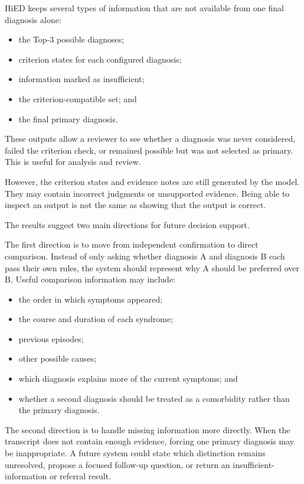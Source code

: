 \documentclass[12pt,a4paper,oneside]{report}
\begin{document}
HiED keeps several types of information that are not available from one
final diagnosis alone:

\begin{itemize}
    \item the Top-3 possible diagnoses;
    \item criterion states for each configured diagnosis;
    \item information marked as insufficient;
    \item the criterion-compatible set; and
    \item the final primary diagnosis.
\end{itemize}

These outputs allow a reviewer to see whether a diagnosis was never
considered, failed the criterion check, or remained possible but was not
selected as primary. This is useful for analysis and review.

However, the criterion states and evidence notes are still generated by
the model. They may contain incorrect judgments or unsupported evidence.
Being able to inspect an output is not the same as showing that the
output is correct.

The results suggest two main directions for future decision support.

The first direction is to move from independent confirmation to direct
comparison. Instead of only asking whether diagnosis A and diagnosis B
each pass their own rules, the system should represent why A should be
preferred over B. Useful comparison information may include:

\begin{itemize}
    \item the order in which symptoms appeared;
    \item the course and duration of each syndrome;
    \item previous episodes;
    \item other possible causes;
    \item which diagnosis explains more of the current symptoms; and
    \item whether a second diagnosis should be treated as a comorbidity
    rather than the primary diagnosis.
\end{itemize}

The second direction is to handle missing information more directly.
When the transcript does not contain enough evidence, forcing one
primary diagnosis may be inappropriate. A future system could state
which distinction remains unresolved, propose a focused follow-up
question, or return an insufficient-information or referral result.
\end{document}

